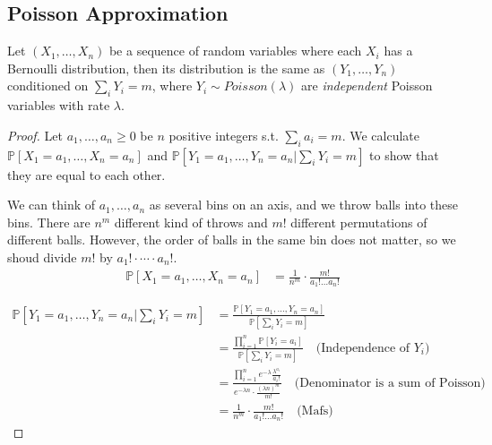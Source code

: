     \subsection{Poisson Approximation}
        \begin{theorem}\label{thm:PoissonApproximation}
            Let $(X_1,\dots,X_n)$ be a sequence of random variables where each $X_i$ has a Bernoulli distribution, then its distribution is the same as $(Y_1, \dots, Y_n)$ conditioned on $\sum_i Y_i = m$, where $Y_i \sim Poisson(\lambda)$ are \emph{independent} Poisson variables with rate $\lambda$.
        \end{theorem}
        \begin{proof}
            Let $a_1, \dots, a_n \ge 0$ be $n$ positive integers s.t. $\sum_i a_i = m$. We calculate $\mathbb{P}[X_1 = a_1, \dots, X_n = a_n]$ and $\mathbb{P}[Y_1 = a_1, \dots, Y_n = a_n|\sum_i Y_i=m]$ to show that they are equal to each other.

            We can think of $a_1,\dots,a_n$ as several bins on an axis, and we throw balls into these bins. There are $n^m$ different kind of throws and $m!$ different permutations of different balls. However, the order of balls in the same bin does not matter, so we shoud divide $m!$ by $a_1!\cdot \cdots \cdot a_n!$.
            \begin{align*}
                \mathbb{P}[X_1 = a_1, \dots, X_n = a_n]
                &= \frac{1}{n^m} \cdot \frac{m!}{a_1! \dots a_n!}
            \end{align*}

            \begin{align*}
                \mathbb{P}[Y_1 = a_1, \dots, Y_n = a_n | \sum_iY_i = m]
                &= \frac{\mathbb{P}[Y_1=a_1,\dots,Y_n=a_n]}{\mathbb{P}[\sum_i Y_i = m]}\\
                &= \frac{\prod_{i=1}^n \mathbb{P}[Y_i = a_i]}{\mathbb{P}[\sum_i Y_i = m]} \quad \text{(Independence of $Y_i$)}\\
                &= \frac{\prod_{i=1}^n e^{-\lambda}\frac{\lambda^{a_i}}{a_i!}}{e^{-\lambda n} \cdot \frac{(\lambda n)^m}{m!}} \quad \text{(Denominator is a sum of Poisson)}\\
                &= \frac{1}{n^m} \cdot \frac{m!}{a_1! \dots a_n!} \quad \text{(Mafs)}
            \end{align*}

        \end{proof}

